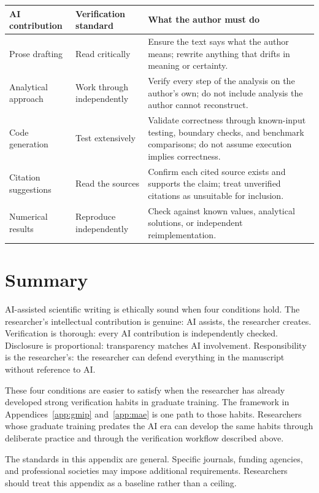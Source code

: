 \documentclass{SIAMbook2023}
\begin{document}
\begin{center}
\begin{tabular}{p{}p{}p{}}
\toprule
\textbf{AI contribution} & \textbf{Verification standard} & \textbf{What the author must do} \\
\midrule
Prose drafting & Read critically & Ensure the text says what the author means; rewrite anything that drifts in meaning or certainty. \\
Analytical approach & Work through independently & Verify every step of the analysis on the author's own; do not include analysis the author cannot reconstruct. \\
Code generation & Test extensively & Validate correctness through known-input testing, boundary checks, and benchmark comparisons; do not assume execution implies correctness. \\
Citation suggestions & Read the sources & Confirm each cited source exists and supports the claim; treat unverified citations as unsuitable for inclusion. \\
Numerical results & Reproduce independently & Check against known values, analytical solutions, or independent reimplementation. \\
\bottomrule
\end{tabular}
\end{center}

\section{Summary}

AI-assisted scientific writing is ethically sound when four conditions hold. The researcher's intellectual contribution is genuine: AI assists, the researcher creates. Verification is thorough: every AI contribution is independently checked. Disclosure is proportional: transparency matches AI involvement. Responsibility is the researcher's: the researcher can defend everything in the manuscript without reference to AI.

These four conditions are easier to satisfy when the researcher has already developed strong verification habits in graduate training. The framework in Appendices~\ref{app:gmip} and~\ref{app:mae} is one path to those habits. Researchers whose graduate training predates the AI era can develop the same habits through deliberate practice and through the verification workflow described above.

The standards in this appendix are general. Specific journals, funding agencies, and professional societies may impose additional requirements. Researchers should treat this appendix as a baseline rather than a ceiling.
\end{document}
